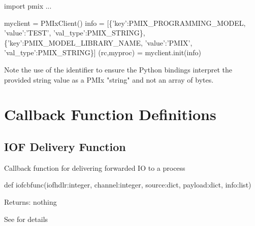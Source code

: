 \begin{codepar}

import pmix
...

myclient = PMIxClient()
info = [\{'key':PMIX_PROGRAMMING_MODEL,
          'value':'TEST', 'val_type':PMIX_STRING\},
        \{'key':PMIX_MODEL_LIBRARY_NAME,
          'value':'PMIX', 'val_type':PMIX_STRING\}]
(rc,myproc) = myclient.init(info)

\end{codepar}

Note the use of the  identifier to ensure the Python bindings interpret the provided string value as a \ac{PMIx} "string" and not an array of bytes.

\section{Callback Function Definitions}
\label{app:python:fns}

\subsection{IOF Delivery Function}

\summary

Callback function for delivering forwarded \ac{IO} to a process

\format

\pyspecificstart
\begin{codepar}
def iofcbfunc(iofhdlr:integer, channel:integer,
              source:dict, payload:dict, info:list)
\end{codepar}
\pyspecificend

\begin{arglist}
\end{arglist}

Returns: nothing

See  for details


